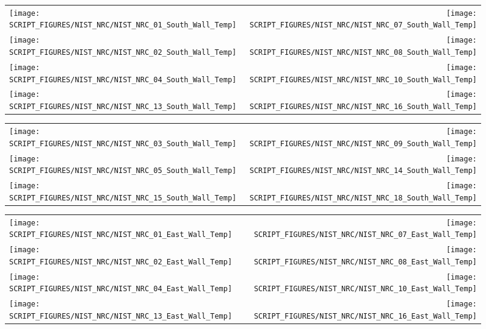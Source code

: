 \begin{figure}[p]
\begin{tabular*}{\textwidth}{l@{\extracolsep{\fill}}r}
\texttt{[image: SCRIPT\_FIGURES/NIST\_NRC/NIST\_NRC\_01\_South\_Wall\_Temp]} &
\texttt{[image: SCRIPT\_FIGURES/NIST\_NRC/NIST\_NRC\_07\_South\_Wall\_Temp]} \\
\texttt{[image: SCRIPT\_FIGURES/NIST\_NRC/NIST\_NRC\_02\_South\_Wall\_Temp]} &
\texttt{[image: SCRIPT\_FIGURES/NIST\_NRC/NIST\_NRC\_08\_South\_Wall\_Temp]} \\
\texttt{[image: SCRIPT\_FIGURES/NIST\_NRC/NIST\_NRC\_04\_South\_Wall\_Temp]} &
\texttt{[image: SCRIPT\_FIGURES/NIST\_NRC/NIST\_NRC\_10\_South\_Wall\_Temp]} \\
\texttt{[image: SCRIPT\_FIGURES/NIST\_NRC/NIST\_NRC\_13\_South\_Wall\_Temp]} &
\texttt{[image: SCRIPT\_FIGURES/NIST\_NRC/NIST\_NRC\_16\_South\_Wall\_Temp]}
\end{tabular*}
\label{NIST_NRC_South_Wall_Temp_Closed}
\end{figure}

\begin{figure}[p]
\begin{tabular*}{\textwidth}{l@{\extracolsep{\fill}}r}
\texttt{[image: SCRIPT\_FIGURES/NIST\_NRC/NIST\_NRC\_03\_South\_Wall\_Temp]} &
\texttt{[image: SCRIPT\_FIGURES/NIST\_NRC/NIST\_NRC\_09\_South\_Wall\_Temp]} \\
\texttt{[image: SCRIPT\_FIGURES/NIST\_NRC/NIST\_NRC\_05\_South\_Wall\_Temp]} &
\texttt{[image: SCRIPT\_FIGURES/NIST\_NRC/NIST\_NRC\_14\_South\_Wall\_Temp]} \\
\texttt{[image: SCRIPT\_FIGURES/NIST\_NRC/NIST\_NRC\_15\_South\_Wall\_Temp]} &
\texttt{[image: SCRIPT\_FIGURES/NIST\_NRC/NIST\_NRC\_18\_South\_Wall\_Temp]}
\end{tabular*}
\label{NIST_NRC_South_Wall_Temp_Open}
\end{figure}

\begin{figure}[p]
\begin{tabular*}{\textwidth}{l@{\extracolsep{\fill}}r}
\texttt{[image: SCRIPT\_FIGURES/NIST\_NRC/NIST\_NRC\_01\_East\_Wall\_Temp]} &
\texttt{[image: SCRIPT\_FIGURES/NIST\_NRC/NIST\_NRC\_07\_East\_Wall\_Temp]} \\
\texttt{[image: SCRIPT\_FIGURES/NIST\_NRC/NIST\_NRC\_02\_East\_Wall\_Temp]} &
\texttt{[image: SCRIPT\_FIGURES/NIST\_NRC/NIST\_NRC\_08\_East\_Wall\_Temp]} \\
\texttt{[image: SCRIPT\_FIGURES/NIST\_NRC/NIST\_NRC\_04\_East\_Wall\_Temp]} &
\texttt{[image: SCRIPT\_FIGURES/NIST\_NRC/NIST\_NRC\_10\_East\_Wall\_Temp]} \\
\texttt{[image: SCRIPT\_FIGURES/NIST\_NRC/NIST\_NRC\_13\_East\_Wall\_Temp]} &
\texttt{[image: SCRIPT\_FIGURES/NIST\_NRC/NIST\_NRC\_16\_East\_Wall\_Temp]}
\end{tabular*}
\label{NIST_NRC_East_Wall_Temp_Closed}
\end{figure}

